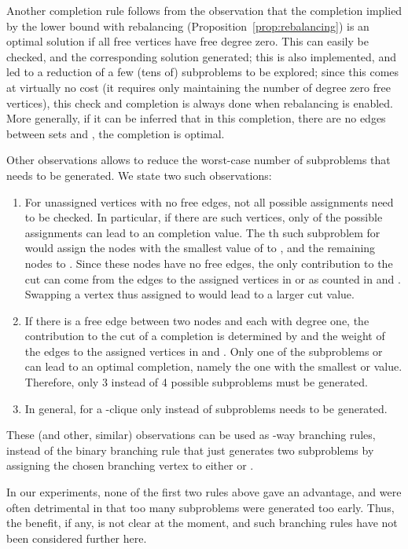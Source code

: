 \documentclass[a4paper,11pt]{article}
\begin{document}
Another completion rule follows from the observation that the
completion implied by the lower bound with rebalancing
(Proposition~\ref{prop:rebalancing}) is an optimal solution if all free
vertices have free degree zero. This can easily be checked, and the
corresponding solution generated; this is also implemented, and led to
a reduction of a few (tens of) subproblems to be explored; since this
comes at virtually no cost (it requires only maintaining the number of
degree zero free vertices), this check and completion is always done
when rebalancing is enabled. More generally, if it can be inferred
that in this completion, there are no edges between sets  and , the completion is optimal.

Other observations allows to reduce the worst-case number of
subproblems that needs to be generated. We state two such
observations:
\begin{enumerate}
\item
  For unassigned vertices with no free edges, not all possible
  assignments need to be checked. In particular, if there are  such
  vertices, only  of the possible  assignments can lead to
  an completion value. The th such subproblem for 
  would assign the  nodes with the smallest value of
   to , and the remaining  nodes
  to . Since these nodes have no free edges, the only
  contribution to the cut can come from the edges to the assigned
  vertices in  or  as counted in  and
  . Swapping a vertex thus assigned to  would lead to a
  larger cut value.
\item
  If there is a free edge between two nodes  and  each with degree
  one, the contribution to the cut of a completion is determined by
   and the weight of the edges to the assigned vertices in 
  and . Only one of the subproblems 
  or  can lead to an optimal completion,
  namely the one with the smallest  or 
  value. Therefore, only 3 instead of 4 possible subproblems must be
  generated.
\item
  In general, for a -clique only  instead of  subproblems
  needs to be generated.
\end{enumerate}
These (and other, similar) observations can be used as
-way branching rules, instead of the binary branching rule that
just generates two subproblems by assigning the chosen branching
vertex to either  or .

In our experiments, none of the first two rules above gave an
advantage, and were often detrimental in that too many subproblems
were generated too early. Thus, the benefit, if any, is not clear at
the moment, and such branching rules have not been considered further
here.
\end{document}
